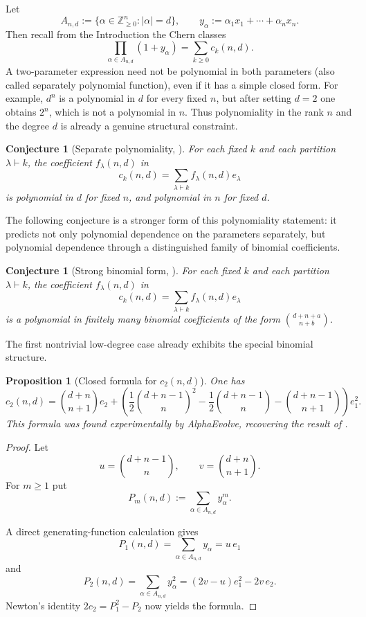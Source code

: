 \documentclass[10pt,a4paper]{amsart}
\numberwithin{equation}{section}
\newtheorem{proposition}[theorem]{Proposition}
\newtheorem{conjecture}[theorem]{Conjecture}
\newcommand{\Z}{\mathbb Z}
\begin{document}
Let
\[
  A_{n,d}:=\{\alpha\in\Z_{\ge0}^n:|\alpha|=d\},\qquad
  y_\alpha:=\alpha_1x_1+\cdots+\alpha_nx_n.
\]
Then recall from the Introduction the Chern classes
\[
  \prod_{\alpha\in A_{n,d}}(1+y_\alpha)=\sum_{k\ge0}c_k(n,d).
\]
A two-parameter expression need not be polynomial in both parameters (also called separately polynomial function), even if it has a simple closed form.  For example, $d^n$ is a polynomial in $d$ for every fixed $n$, but after setting $d=2$ one obtains $2^n$, which is not a polynomial in $n$.  Thus polynomiality in the rank $n$ and the degree $d$ is already a genuine structural constraint.

\begin{conjecture}[Separate polynomiality, \cite{feher2025polynomiality}]\label{conj:polynomiality}
For each fixed $k$ and each partition $\lambda\vdash k$, the coefficient $f_\lambda(n,d)$ in
\[
  c_k(n,d)=\sum_{\lambda\vdash k}f_\lambda(n,d)e_\lambda
\]
is polynomial in $d$ for fixed $n$, and polynomial in $n$ for fixed $d$.
\end{conjecture}

The following conjecture is a stronger form of this polynomiality statement: it predicts not only polynomial dependence on the parameters separately, but polynomial dependence through a distinguished family of binomial coefficients.

\begin{conjecture}[Strong binomial form, \cite{feher2025polynomiality}]\label{conj:binomial-form}
For each fixed $k$ and each partition $\lambda\vdash k$, the coefficient $f_\lambda(n,d)$ in
\[
  c_k(n,d)=\sum_{\lambda\vdash k}f_\lambda(n,d)e_\lambda
\]
is a polynomial in finitely many binomial coefficients of the form $\binom{d+n+a}{n+b}$.
\end{conjecture}

The first nontrivial low-degree case already exhibits the special binomial structure.

\begin{proposition}[Closed formula for $c_2(n,d)$]\label{prop:c2}
One has
\[
  c_2(n,d)=\binom{d+n}{n+1}e_2+
  \left(
    \frac12\binom{d+n-1}{n}^2
    -\frac12\binom{d+n-1}{n}
    -\binom{d+n-1}{n+1}
  \right)e_1^2.
\]
This formula was  found experimentally by AlphaEvolve, recovering the result of \cite{ciliberto_zaidenberg2020onfanoschemes}.
\end{proposition}

\begin{proof}
Let
\[
  u=\binom{d+n-1}{n},\qquad v=\binom{d+n}{n+1}.
\]
For $m\ge1$ put
\[
  P_m(n,d):=\sum_{\alpha\in A_{n,d}}y_\alpha^m.
\]

A direct generating-function calculation gives
\[
  P_1(n,d)=\sum_{\alpha\in A_{n,d}}y_\alpha=u\,e_1
\]
and
\[
  P_2(n,d)=\sum_{\alpha\in A_{n,d}}y_\alpha^2=(2v-u)e_1^2-2v\,e_2.
\]
Newton's identity $2c_2=P_1^2-P_2$ now yields the formula.
\end{proof}
\end{document}
